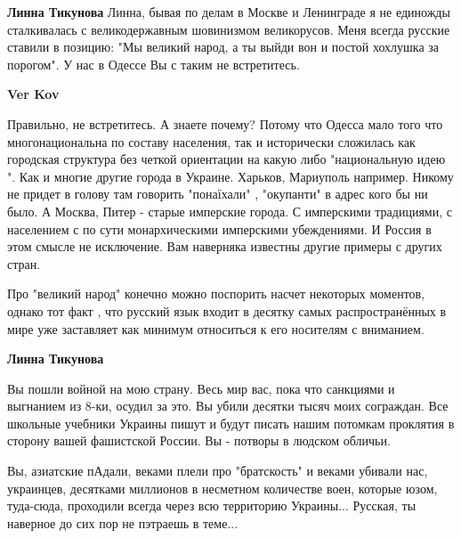 \begin{itemize}
\begin{itemize}
 
\textbf{Линна Тикунова} Линна, бывая по делам в Москве и Ленинграде я не
единожды сталкивалась с великодержавным шовинизмом великорусов. Меня всегда
русские ставили в позицию: "Мы великий народ, а ты выйди вон и постой хохлушка
за порогом". У нас в Одессе Вы с таким не встретитесь.

 
\textbf{Ver Kov} 

Правильно, не встретитесь. А знаете почему? Потому что Одесса мало того что
многонациональна по составу населения, так и исторически сложилась как
городская структура без четкой ориентации на какую либо "национальную идею ".
Как и многие другие города в Украине. Харьков, Мариуполь например. Никому не
придет в голову там говорить "понаїхали" , "окупанти" в адрес кого бы ни было.
А Москва, Питер - старые имперские города. С имперскими традициями, с
населением с по сути монархическими имперскими убеждениями. И Россия в этом
смысле не исключение. Вам наверняка известны другие примеры с других стран.

Про "великий народ" конечно можно поспорить насчет некоторых моментов, однако
тот факт , что русский язык входит в десятку самых распространённых в мире уже
заставляет как минимум относиться к его носителям с вниманием.

 
\textbf{Линна Тикунова} 

Вы пошли войной на мою страну. Весь мир вас, пока что
санкциями и выгнанием из 8-ки, осудил за это. Вы убили десятки тысяч моих
сограждан. Все школьные учебники Украины пишут и будут писать нашим потомкам
проклятия в сторону вашей фашистской России. Вы - потворы в людском обличьи.

Вы, азиатские пАдали, веками плели про "братскость" и веками убивали нас,
украинцев, десятками миллионов в несметном количестве воен, которые юзом,
туда-сюда, проходили всегда через всю территорию Украины... Русская, ты
наверное до сих пор не пэтраешь в теме...


\end{itemize}
\end{itemize}
